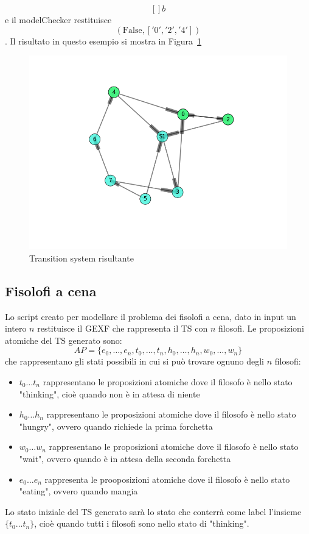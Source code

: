 \documentclass[a4paper, 10pt]{article}
\numberwithin{equation}{theor}
\begin{document}
$$[] b$$
e il modelChecker restituisce 
$$(\text{False}, ['0', '2', '4'])$$.
Il risultato in questo esempio si mostra in Figura~\ref{tsResult2}
\begin{figure}
  \includegraphics[width=\linewidth]{img/tsResult2.png}
  \caption{Transition system risultante}
  \label{tsResult2}
\end{figure}

\subsection{Fisolofi a cena}

Lo script creato per modellare il problema dei fisolofi a cena, dato in input un intero $n$ restituisce il \ac{GEXF} che rappresenta il \ac{TS} con $n$ filosofi.
Le proposizioni atomiche del \ac{TS} generato sono:
$$AP = \{e_0, \dots, e_n, t_0, \dots, t_n, h_0, \dots, h_n, w_0, \dots, w_n \}$$
che rappresentano gli stati possibili in cui si può trovare ognuno degli $n$ filosofi:
\begin{itemize}
  \item{$t_0 \dots t_n$ rappresentano le proposizioni atomiche dove il filosofo è nello stato "thinking", cioè quando non è in attesa di niente}
  \item{$h_0 \dots h_n$ rappresentano le proposizioni atomiche dove il filosofo è nello stato "hungry", ovvero quando richiede la prima forchetta}
  \item{$w_0 \dots w_n$ rappresentano le proposizioni atomiche dove il filosofo è nello stato "wait", ovvero quando è in attesa della seconda forchetta}
  \item{$e_0 \dots e_n$ rappresenta le prooposizioni atomiche dove il filosofo è nello stato "eating", ovvero quando mangia}
\end{itemize}
Lo stato iniziale del \ac{TS} generato sarà lo stato che conterrà come label l'insieme $\{t_0 \dots t_n\}$, cioè quando tutti i filosofi sono nello stato di "thinking".
\end{document}
